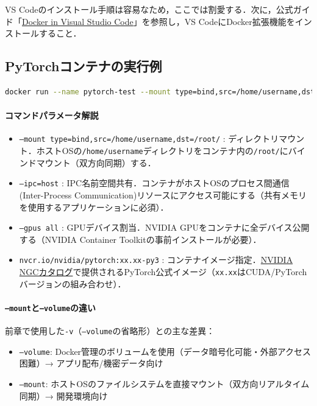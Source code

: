 VS Codeのインストール手順は容易なため，ここでは割愛する．次に，公式ガイド「\href{https://code.visualstudio.com/docs/containers/overview}{Docker in Visual Studio Code}」を参照し，VS CodeにDocker拡張機能をインストールすること．

\subsection{PyTorchコンテナの実行例}
\begin{lstlisting}[language=bash]
docker run --name pytorch-test --mount type=bind,src=/home/username,dst=/root/ --gpus all --ipc=host -it nvcr.io/nvidia/pytorch:xx.xx-py3
\end{lstlisting}

\paragraph{コマンドパラメータ解説}
\begin{itemize}
\item \texttt{--mount type=bind,src=/home/username,dst=/root/} :
ディレクトリマウント．ホストOSの\texttt{/home/username}ディレクトリをコンテナ内の\texttt{/root/}にバインドマウント（双方向同期）する．

\item \texttt{--ipc=host} :
IPC名前空間共有．コンテナがホストOSのプロセス間通信(Inter-Process Communication)リソースにアクセス可能にする（共有メモリを使用するアプリケーションに必須）．

\item \texttt{--gpus all} :
GPUデバイス割当．NVIDIA GPUをコンテナに全デバイス公開する（NVIDIA Container Toolkitの事前インストールが必要）．

\item \texttt{nvcr.io/nvidia/pytorch:xx.xx-py3} :
コンテナイメージ指定．\href{https://docs.nvidia.com/deeplearning/frameworks/support-matrix/index.html}{NVIDIA NGCカタログ}で提供されるPyTorch公式イメージ（\texttt{xx.xx}はCUDA/PyTorchバージョンの組み合わせ）．
\end{itemize}


\paragraph{\texttt{--mount}と\texttt{--volume}の違い}
前章で使用した\texttt{-v}（\texttt{--volume}の省略形）との主な差異：
\begin{itemize}
\item \texttt{--volume}: Docker管理のボリュームを使用（データ暗号化可能・外部アクセス困難）→ アプリ配布/機密データ向け
\item \texttt{--mount}: ホストOSのファイルシステムを直接マウント（双方向リアルタイム同期）→ 開発環境向け
\end{itemize}

